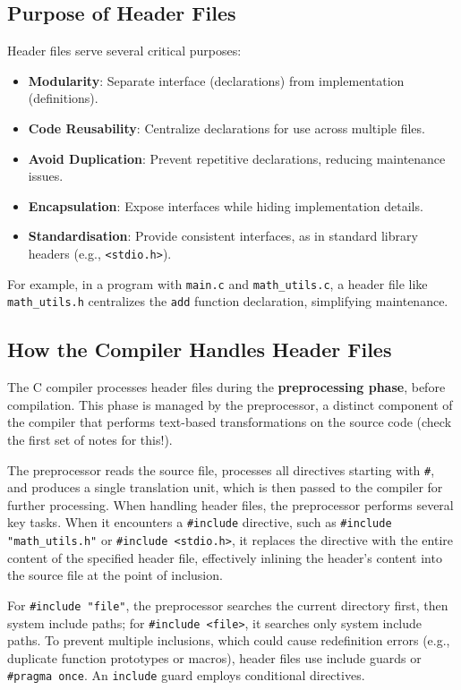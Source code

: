 \documentclass[a4paper,12pt]{article}
\begin{document}
\subsection{Purpose of Header Files}

Header files serve several critical purposes:
\begin{itemize}[noitemsep]
    \item \textbf{Modularity}: Separate interface (declarations) from implementation (definitions).
    \item \textbf{Code Reusability}: Centralize declarations for use across multiple files.
    \item \textbf{Avoid Duplication}: Prevent repetitive declarations, reducing maintenance issues.
    \item \textbf{Encapsulation}: Expose interfaces while hiding implementation details.
    \item \textbf{Standardisation}: Provide consistent interfaces, as in standard library headers (e.g., \texttt{<stdio.h>}).
\end{itemize}

For example, in a program with \texttt{main.c} and \texttt{math\_utils.c}, a header file like \texttt{math\_utils.h} centralizes the \texttt{add} function declaration, simplifying maintenance.

\subsection{How the Compiler Handles Header Files}

The C compiler processes header files during the \textbf{preprocessing phase}, before compilation. This phase is managed by the preprocessor, a distinct component of the compiler that performs text-based transformations on the source code (check the first set of notes for this!). 

The preprocessor reads the source file, processes all directives starting with \texttt{\#}, and produces a single translation unit, which is then passed to the compiler for further processing. When handling header files, the preprocessor performs several key tasks. When it encounters a \texttt{\#include} directive, such as \texttt{\#include "math\_utils.h"} or \texttt{\#include <stdio.h>}, it replaces the directive with the entire content of the specified header file, effectively inlining the header’s content into the source file at the point of inclusion. 

For \texttt{\#include "file"}, the preprocessor searches the current directory first, then system include paths; for \texttt{\#include <file>}, it searches only system include paths. To prevent multiple inclusions, which could cause redefinition errors (e.g., duplicate function prototypes or macros), header files use include guards or \texttt{\#pragma once}. An \verb|include| guard employs conditional directives.
\end{document}
